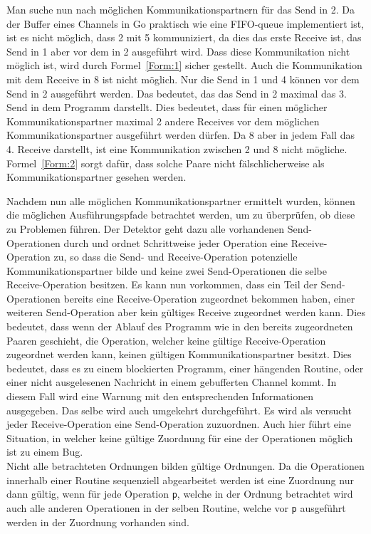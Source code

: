 Man suche nun nach möglichen Kommunikationspartnern für das Send in 2. 
Da der Buffer eines Channels in Go praktisch wie eine FIFO-queue implementiert
ist, ist es nicht möglich, dass 2 mit 5 kommuniziert, da dies das erste 
Receive ist, das Send in 1 aber vor dem in 2 ausgeführt wird. Dass diese 
Kommunikation nicht möglich ist, wird durch Formel~\ref{Form:1} sicher gestellt.
Auch die Kommunikation mit dem Receive in 8 ist nicht möglich. Nur die Send in 
1 und 4 können vor dem Send in 2 ausgeführt werden. Das bedeutet, das das 
Send in 2 maximal das 3. Send in dem Programm darstellt. Dies bedeutet, 
dass für einen möglicher Kommunikationspartner maximal 2 andere Receives vor dem 
möglichen Kommunikationspartner ausgeführt werden dürfen. Da 8 aber in jedem 
Fall das 4. Receive darstellt, ist eine Kommunikation zwischen 2 und 8 nicht mögliche.
Formel~\ref{Form:2} sorgt dafür, dass solche Paare nicht fälschlicherweise 
als Kommunikationspartner gesehen werden.

Nachdem nun alle möglichen Kommunikationspartner ermittelt wurden, 
können die möglichen Ausführungspfade betrachtet werden, um zu überprüfen, 
ob diese zu Problemen führen. Der Detektor geht dazu alle vorhandenen Send-Operationen 
durch und ordnet Schrittweise jeder Operation eine Receive-Operation zu, so dass 
die Send- und Receive-Operation potenzielle Kommunikationspartner 
bilde und keine zwei Send-Operationen die selbe Receive-Operation 
besitzen. Es kann nun vorkommen, dass ein Teil der Send-Operationen bereits eine 
Receive-Operation zugeordnet bekommen haben, einer weiteren Send-Operation 
aber kein gültiges Receive zugeordnet werden kann. Dies bedeutet, dass 
wenn der Ablauf des Programm wie in den bereits zugeordneten Paaren geschieht, die Operation, 
welcher keine gültige Receive-Operation zugeordnet werden kann, keinen 
gültigen Kommunikationspartner besitzt. Dies bedeutet, dass es zu einem 
blockierten Programm, einer hängenden Routine, oder einer nicht ausgelesenen Nachricht 
in einem gebufferten Channel kommt. In diesem Fall wird eine Warnung 
mit den entsprechenden Informationen ausgegeben. Das selbe wird auch umgekehrt durchgeführt. Es wird als 
versucht jeder Receive-Operation eine Send-Operation zuzuordnen. 
Auch hier führt eine Situation, in welcher keine gültige Zuordnung für eine der Operationen 
möglich ist zu einem Bug. \\
Nicht alle betrachteten Ordnungen bilden gültige Ordnungen. Da die Operationen 
innerhalb einer Routine sequenziell abgearbeitet werden ist eine Zuordnung nur 
dann gültig, wenn für jede Operation \texttt{p}, welche in der Ordnung 
betrachtet wird auch alle anderen Operationen in der selben Routine, welche 
vor \texttt{p} ausgeführt werden in der Zuordnung vorhanden sind.

